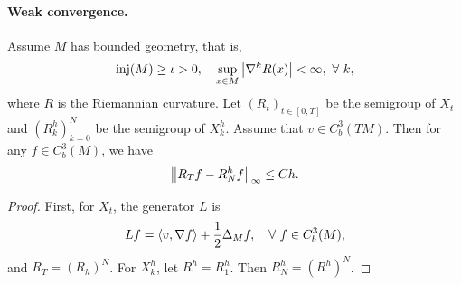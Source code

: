 \paragraph{Weak convergence.} Assume $M$ has bounded geometry, that is,
        \begin{equation*}
            \operatorname{inj}(M) \geq \iota > 0,\quad \sup_{x \in M} \left\lvert\nabla^k R(x)\right\lvert < \infty,~\forall~k,
        \end{equation*}
        where $R$ is the Riemannian curvature. Let $(R_t)_{t \in [0,T]}$ be the semigroup of $X_t$ and $(R^h_k)_{k=0}^N$ be the semigroup of $X^h_k$. Assume that $v \in C^3_b(TM)$. Then for any $f \in C_b^3(M)$, we have
\begin{equation*}
    \left\lVert R_Tf - R_N^h f\right\lVert_\infty \leq Ch.
\end{equation*}
\begin{proof}
    First, for $X_t$, the generator $L$ is
    \begin{equation*}
        Lf = \left\langle v,\nabla f \right\rangle + \frac{1}{2}\Delta_M f,\quad \forall~ f \in C_b^3(M),
    \end{equation*}
    and $R_T = (R_h)^N$. For $X^h_k$, let $R^h = R_1^h$. Then $R^h_N = (R^h)^N$.
    

\end{proof}
